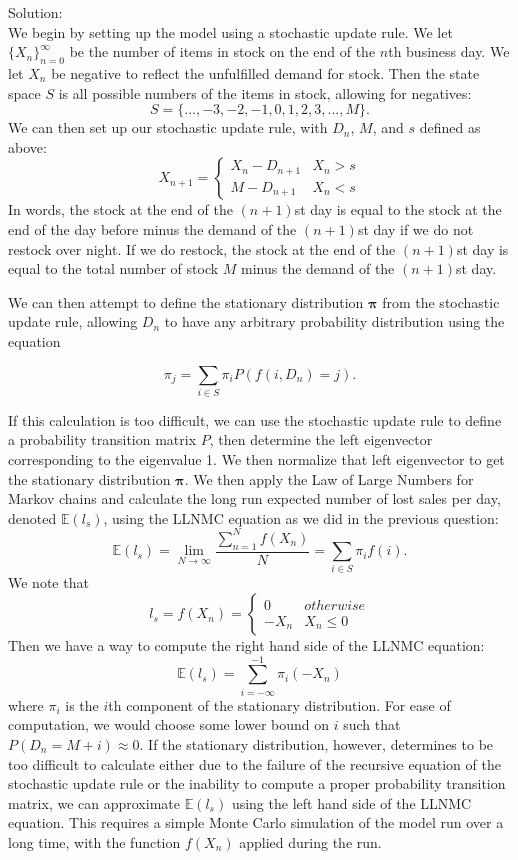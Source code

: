 \documentclass[12pt]{article}
\numberwithin{equation}{section}
\newcommand{\M}{\mathcal{M}}
\begin{document}
\begin{enumerate}
\begin{enumerate}
        Solution:\\
        
        We begin by setting up the model using a stochastic update rule. We let $\{X_n\}_{n=0}^\infty$ be the number of items in stock on the end of the $n$th business day. We let $X_n$ be negative to reflect the unfulfilled demand for stock. Then the state space $S$ is all possible numbers of the items in stock, allowing for negatives:
        $$S=\{...,-3,-2,-1,0,1,2,3,...,M\}.$$
        We can then set up our stochastic update rule, with $D_n$, $M$, and $s$ defined as above:
        $$X_{n+1}=\left\{\begin{array}{cc}X_n-D_{n+1}&X_n>s\\M-D_{n+1}&X_n<s\end{array}\right.$$
        In words, the stock at the end of the $(n+1)$st day is equal to the stock at the end of the day before minus the demand of the $(n+1)$st day if we do not restock over night. If we do restock, the stock at the end of the $(n+1)$st day is equal to the total number of stock $M$ minus the demand of the $(n+1)$st day.
        
        
        We can then attempt to define the stationary distribution $\mathbf{\pi}$ from the stochastic update rule, allowing $D_n$ to have any arbitrary probability distribution using the equation

        $$\pi_j=\sum_{i\in S}\pi_i P(f(i,D_n)=j).$$

        If this calculation is too difficult, we can use the stochastic update rule to define a probability transition matrix $P$, then determine the left eigenvector corresponding to the eigenvalue 1. We then normalize that left eigenvector to get the stationary distribution $\mathbf{\pi}$. We then apply the Law of Large Numbers for Markov chains and calculate the long run expected number of lost sales per day, denoted $\mathbb{E}(l_s)$, using the LLNMC equation as we did in the previous question:
        $$\mathbb{E}(l_s)=\lim_{N\to\infty}\frac{\sum_{n=1}^Nf(X_n)}{N}=\sum_{i\in S}\pi_if(i).$$
        We note that 
        $$l_s=f(X_n)=\left\{\begin{array}{cc}0&otherwise\\-X_n&X_n\leq 0\end{array}\right.$$
        Then we have a way to compute the right hand side of the LLNMC equation:
        $$\mathbb{E}(l_s)=\sum_{i=-\infty}^{-1}\pi_i(-X_n)$$
        where $\pi_i$ is the $i$th component of the stationary distribution. For ease of computation, we would choose some lower bound on $i$ such that $P(D_n=M+i)\approx 0$. If the stationary distribution, however, determines to be too difficult to calculate either due to the failure of the recursive equation of the stochastic update rule or the inability to compute a proper probability transition matrix, we can approximate $\mathbb{E}(l_s)$ using the left hand side of the LLNMC equation. This requires a simple Monte Carlo simulation of the model run over a long time, with the function $f(X_n)$ applied during the run.
        

\end{enumerate}
\end{enumerate}
\end{document}
